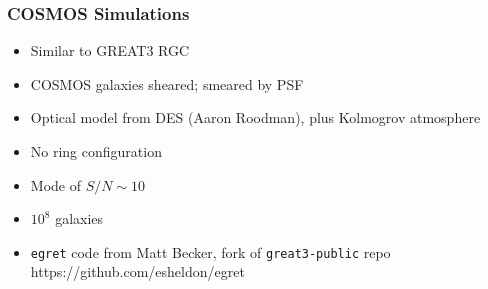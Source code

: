 \documentclass{beamer}
\begin{document}


\frame
{
    \frametitle{COSMOS Simulations}

 
    \begin{itemize}
        \item Similar to {\color{lightskyblue} GREAT3 RGC}

        \item COSMOS galaxies sheared; smeared by PSF

        \item Optical model from DES (Aaron Roodman), plus Kolmogrov atmosphere
        \item {\color{gold} No ring} configuration
        \item Mode of {\color{orange} $S/N \sim 10$}
        \item $10^8$ galaxies

        \item {\color{gold} \texttt{egret}} code from Matt Becker, fork of \texttt{great3-public} repo
            https://github.com/esheldon/egret

    \end{itemize}

}
\end{document}
